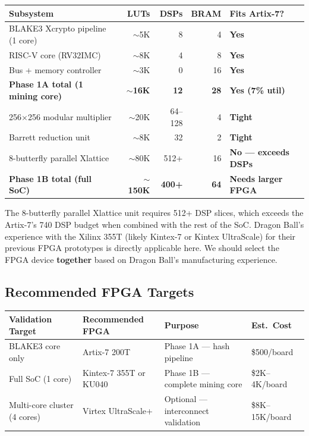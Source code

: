 \documentclass[11pt,a4paper]{article}
\begin{document}
\begin{center}
\begin{tabular}{@{}lrrrl@{}}
\toprule
\textbf{Subsystem} & \textbf{LUTs} & \textbf{DSPs} & \textbf{BRAM} & \textbf{Fits Artix-7?} \\
\midrule
BLAKE3 Xcrypto pipeline (1 core) & $\sim$5K & 8 & 4 & \textcolor{qnkgreen}{\textbf{Yes}} \\
RISC-V core (RV32IMC) & $\sim$8K & 4 & 8 & \textcolor{qnkgreen}{\textbf{Yes}} \\
Bus + memory controller & $\sim$3K & 0 & 16 & \textcolor{qnkgreen}{\textbf{Yes}} \\
\textbf{Phase 1A total (1 mining core)} & \textbf{$\sim$16K} & \textbf{12} & \textbf{28} & \textcolor{qnkgreen}{\textbf{Yes (7\% util)}} \\
\midrule
256$\times$256 modular multiplier & $\sim$20K & 64--128 & 4 & \textcolor{qnkamber}{\textbf{Tight}} \\
Barrett reduction unit & $\sim$8K & 32 & 2 & \textcolor{qnkamber}{\textbf{Tight}} \\
8-butterfly parallel Xlattice & $\sim$80K & 512+ & 16 & \textcolor{dbred}{\textbf{No --- exceeds DSPs}} \\
\textbf{Phase 1B total (full SoC)} & \textbf{$\sim$150K} & \textbf{400+} & \textbf{64} & \textcolor{dbred}{\textbf{Needs larger FPGA}} \\
\bottomrule
\end{tabular}
\end{center}

\begin{keyinsight}
The 8-butterfly parallel Xlattice unit requires 512+ DSP slices, which exceeds the Artix-7's 740 DSP budget when combined with the rest of the SoC. Dragon Ball's experience with the Xilinx 355T (likely Kintex-7 or Kintex UltraScale) for their previous FPGA prototypes is directly applicable here. We should select the FPGA device \textbf{together} based on Dragon Ball's manufacturing experience.
\end{keyinsight}

\subsection{Recommended FPGA Targets}

\begin{center}
\begin{tabular}{@{}llll@{}}
\toprule
\textbf{Validation Target} & \textbf{Recommended FPGA} & \textbf{Purpose} & \textbf{Est.\ Cost} \\
\midrule
BLAKE3 core only & Artix-7 200T & Phase 1A --- hash pipeline & \$500/board \\
Full SoC (1 core) & Kintex-7 355T or KU040 & Phase 1B --- complete mining core & \$2K--4K/board \\
Multi-core cluster (4 cores) & Virtex UltraScale+ & Optional --- interconnect validation & \$8K--15K/board \\
\bottomrule
\end{tabular}
\end{center}
\end{document}
